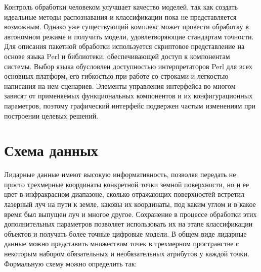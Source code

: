 \begin{multicols}{2}
   Контроль обработки человеком улучшает качество моделей, так как создать 
идеальные методы распознавания и классификации пока не пред\-став\-ля\-ет\-ся 
возможным. Однако уже существующий комплекс может провести обработку в 
автономном режиме и получить модели, удовле\-тво\-ря\-ющие стандартам 
точности. Для описания пакетной обработки используется скриптовое 
представление на основе языка Perl и библиотеки, обес\-пе\-чи\-ва\-ющей доступ к 
компонентам системы. Выбор языка обусловлен доступностью 
интерпретаторов Perl для всех основных платформ, его гибкостью при работе 
со строками и легкостью написания на нем сценариев. Элементы управления 
интерфейса во многом зависят от применяемых функциональных компонентов 
и их конфигурационных параметров, поэтому графический интерфейс 
подвержен частым изменениям при построении целевых решений.

  \section{Схема данных}
   
   Лидарные данные имеют высокую информативность, позволяя передать не 
просто трехмерные координаты конкретной точки земной поверхности, но и ее 
цвет в инфракрасном диапазоне, сколько отражающих поверхностей встретил 
лазерный луч на пути к земле, каковы их координаты, под каким углом и в 
какое время был выпущен луч и многое другое. Сохранение в процессе 
обработки этих дополнительных параметров позволяет использовать их на 
этапе классификации объектов и получать более точные цифровые модели. В 
общем виде лидарные данные можно представить множеством точек в 
трехмерном пространстве с некоторым набором обязательных и 
необязательных атрибутов у каждой точки. Формальную схему можно 
определить так:
   
   \end{multicols}
   
